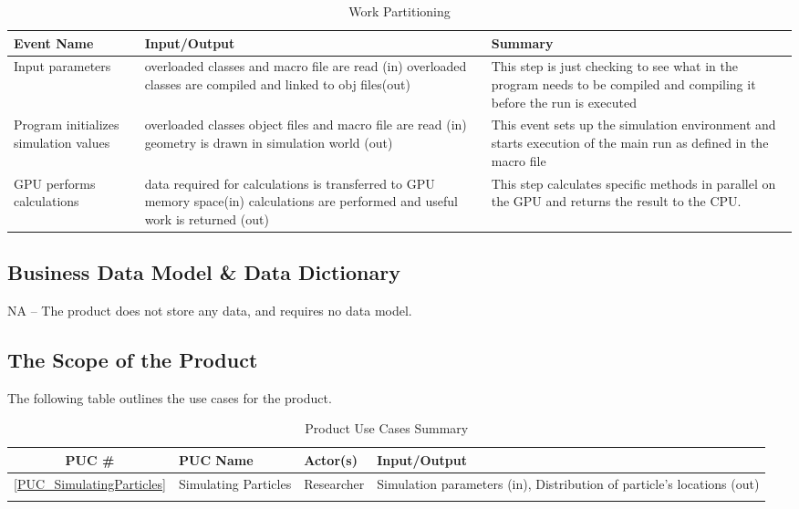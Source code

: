 \documentclass[12pt]{article}
\newcommand{\todo}[1]{\textcolor{red}{[TODO: #1]}} \else
\newcommand{\authornote}[3]{} \newcommand{\todo}[1]{} \fi
\newcommand{\ds}[1]{\authornote{blue}{DS}{#1}} %
\newcommand{\vr}[1]{\authornote{green}{VR}{#1}}
\begin{document}
\begin{table}[h]
\centering
\caption{Work Partitioning}
\begin{tabularx}{\textwidth}{XXX}
\Xhline{2\arrayrulewidth}
\bf Event Name & \bf Input/Output & \bf Summary\\
\hline
Input parameters & overloaded classes and macro file are read (in) overloaded 
classes are compiled and linked to obj files(out) & This step is just checking to see what in the program 
needs to be compiled and compiling it before the run is executed \\
 Program initializes simulation values& overloaded classes object files and 
macro file are read (in) geometry is drawn in simulation world (out) & This event sets up the simulation 
environment and starts execution of the main run as defined in the macro file \\
GPU performs calculations & data required for calculations is transferred to 
GPU memory space(in) calculations are performed and useful work is returned (out)& This step calculates specific methods in parallel on the GPU and returns the result to the CPU.  \\
\hline
\end{tabularx}
\end{table}
\ds{This section is supposed to show a breakdown of the business use cases}\vr{revised this section}
\subsection{Business Data Model \& Data Dictionary} %
NA -- The product does not store any data, and requires no data model.

\subsection{The Scope of the Product}
The following table outlines the use cases for the product.

\begin{table}[h]
\centering
\caption{Product Use Cases Summary}
\begin{tabularx}{\textwidth}{c|l|l|X}
\Xhline{2\arrayrulewidth}
\bf PUC \# & \bf PUC Name & Actor(s) & \bf Input/Output\\
\hline
\ref{PUC_SimulatingParticles} & Simulating Particles & Researcher & Simulation parameters (in), Distribution of particle's locations (out)\\
\Xhline{2\arrayrulewidth}
\end{tabularx}
\end{table}
\end{document}

